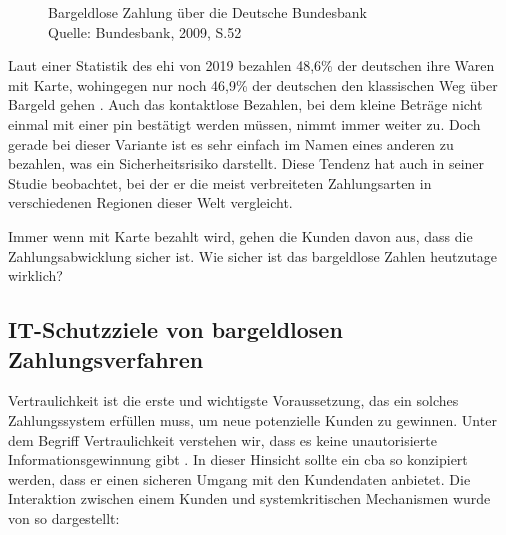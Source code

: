\begin{figure}[H]
    \caption{Bargeldlose Zahlung über die Deutsche Bundesbank\\ Quelle: Bundesbank, 2009, S.52}
    \label{fig:refrep_DB}
\end{figure}


Laut einer Statistik des \acrfull{ehi} von 2019 bezahlen 48,6\% der deutschen ihre Waren mit Karte, 
wohingegen nur noch 46,9\% der deutschen den klassischen Weg über Bargeld gehen \cite{refart:KSDL} . 
Auch das kontaktlose Bezahlen, bei dem kleine Beträge nicht einmal mit einer \acrfull{pin} bestätigt 
werden müssen, nimmt immer weiter zu. Doch gerade bei dieser Variante ist es sehr einfach im Namen 
eines anderen zu bezahlen, was ein Sicherheitsrisiko darstellt. Diese Tendenz hat \cite{refart:TDMP} auch 
in seiner Studie beobachtet, bei der er die meist verbreiteten Zahlungsarten in verschiedenen Regionen
dieser Welt vergleicht. 


Immer wenn mit Karte bezahlt wird, gehen die Kunden davon aus, dass die Zahlungsabwicklung sicher ist. 
Wie sicher ist das bargeldlose Zahlen heutzutage wirklich? 


\subsection{IT-Schutzziele von bargeldlosen Zahlungsverfahren}


Vertraulichkeit ist die erste und wichtigste Voraussetzung, das ein solches Zahlungssystem erfüllen muss, 
um neue potenzielle Kunden zu gewinnen. Unter dem Begriff Vertraulichkeit verstehen wir, dass es keine 
unautorisierte Informationsgewinnung gibt \cite{refbook:SWIS}. In dieser Hinsicht sollte ein \acrshort{cba}
so konzipiert werden, dass er einen sicheren Umgang mit den Kundendaten anbietet. Die Interaktion zwischen
einem Kunden und systemkritischen Mechanismen wurde von \cite{refart:HARE} so dargestellt:

